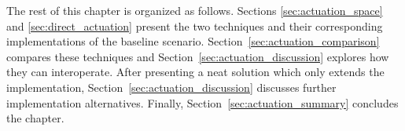 \bigskip

The rest of this chapter is organized as follows.
Sections \ref{sec:actuation_space} and \ref{sec:direct_actuation} present the two techniques and their corresponding implementations of the baseline scenario. %
Section~\ref{sec:actuation_comparison} compares these techniques and Section~\ref{sec:actuation_discussion} explores how they can interoperate. %
After presenting a neat solution which only extends the \Space{} implementation, Section~\ref{sec:actuation_discussion} discusses further implementation alternatives.
Finally, Section~\ref{sec:actuation_summary} concludes the chapter.









